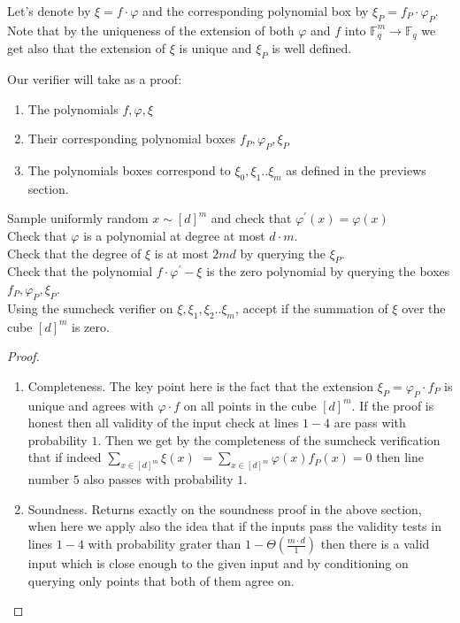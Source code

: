 \documentclass{article}
\newcommand{\FF}{\mathbb{F}_{q}}
\begin{document}
Let's denote by $\xi = f\cdot\varphi$ and the corresponding polynomial box by $\xi_{P} = f_{P} \cdot \varphi_{P}$. Note that by the uniqueness of the extension of both $\varphi$ and $f$ into $\FF^{m}\rightarrow \FF$ we get also that the extension of $\xi$ is unique and $\xi_{P}$ is well defined.  

Our verifier will take as a proof: 
\begin{enumerate}
  \item The polynomials $f,\varphi, \xi$ 
  \item Their corresponding polynomial boxes $f_{P},\varphi_{P}, \xi_{P}$ 
  \item The polynomials boxes correspond to $\xi_{0}, \xi_{1} .. \xi_{m}$ as defined in the previews section.  
\end{enumerate}

\begin{algorithm}[H]
  Sample uniformly random $x \sim  [d]^{m}$ and check that $\varphi^{\prime}\left( x \right) = \varphi\left( x \right)$   \\
  Check that $\varphi$ is a polynomial at degree at most $d\cdot m$. \\
  Check that the degree of $\xi$ is at most $2md$ by querying the $\xi_{P}$.\\ 
  Check that the polynomial $f\cdot \varphi^{\prime} - \xi$ is the zero polynomial by querying the boxes $f_{P},\varphi_{P},\xi_{P}$. \\
  Using the sumcheck verifier on $\xi, \xi_{1},\xi_{2} .. \xi_{m}$, accept if the summation of $\xi$ over the cube $[d]^{m}$ is zero.  
\end{algorithm}

\begin{proof} \ 


  \begin{enumerate}
    \item Completeness. The key point here is the fact that the extension $\xi_{P} = \varphi_{P} \cdot f_{P}$ is unique and agrees with $\varphi\cdot f$ on all points in the cube $[d]^{m}$. If the proof is honest then all validity of the input check at lines $1-4$ are pass with probability $1$. Then we get by the completeness of the sumcheck verification that if indeed $\sum_{x \in [d]^{m}}{ \xi(x) }$ $ = \sum_{x \in [d]^{m}}{ \varphi(x)f_{P}(x) } = 0$ then line number $5$ also passes with probability $1$. 
    \item Soundness. Returns exactly on the soundness proof in the above section, when here we apply also the idea that if the inputs pass the validity tests in lines $1-4$ with probability grater than $1-\Theta(\frac{m\cdot d}{1})$ then there is a valid input which is close enough to the given input and by conditioning on querying only points that both of them agree on.  
  \end{enumerate}
\end{proof}
\end{document}
